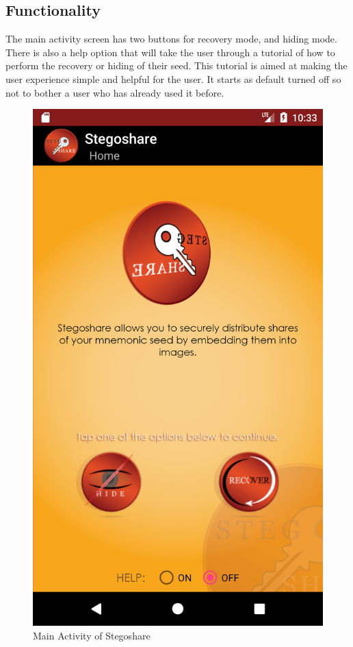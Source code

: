 \subsection{Functionality}
The main activity screen has two buttons for recovery mode, and hiding mode. There is also a help option that will take the user through a tutorial
of how to perform the recovery or hiding of their seed. This tutorial is aimed at making the user experience simple and helpful for the user. It starts
as default turned off so not to bother a user who has already used it before.

\begin{figure}[H]
	\centering
  \includegraphics[scale = 0.08]{main_activity.png}
	\caption{Main Activity of Stegoshare}
	\label{fig: Main activity}
\end{figure}

